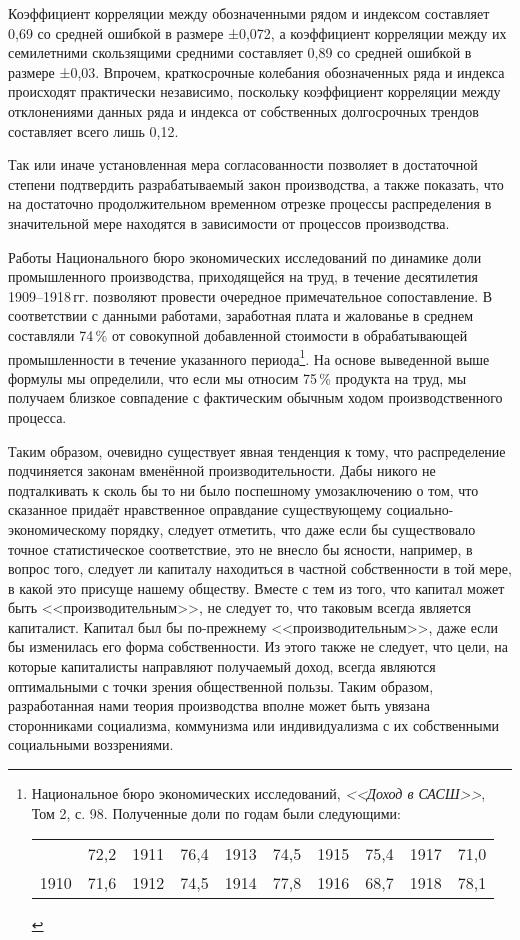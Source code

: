 \documentclass[leqno]{article}  %
\begin{document}
\par
Коэффициент корреляции между обозначенными рядом и индексом составляет 0,69 со средней ошибкой в размере ±0,072, а коэффициент корреляции между их семилетними скользящими средними составляет 0,89 со средней ошибкой в размере ±0,03. Впрочем, краткосрочные колебания обозначенных ряда и индекса происходят практически независимо, поскольку коэффициент корреляции между отклонениями данных ряда и индекса от собственных долгосрочных трендов составляет всего лишь 0,12.
\par
Так или иначе установленная мера согласованности позволяет в достаточной степени подтвердить разрабатываемый закон производства, а также показать, что на достаточно продолжительном временном отрезке процессы распределения в значительной мере находятся в зависимости от процессов производства.
\par
Работы Национального бюро экономических исследований по динамике доли промышленного производства, приходящейся на труд, в течение десятилетия 1909--1918\,гг. позволяют провести очередное примечательное сопоставление. В соответствии с данными работами, заработная плата и жалованье в среднем составляли 74\,\% от совокупной добавленной стоимости в обрабатывающей промышленности в течение указанного периода\footnote{Национальное бюро экономических исследований, \emph{<<Доход в САСШ>>}, Том 2, с. 98. Полученные доли по годам были следующими:
\begin{tabular}{lrlrlrlrlr}
\centering
1909 & 72,2 & 1911 & 76,4 & 1913 & 74,5 & 1915 & 75,4 & 1917 & 71,0\\
1910 & 71,6 & 1912 & 74,5 & 1914 & 77,8 & 1916 & 68,7 & 1918 & 78,1
\end{tabular}}.
На основе выведенной выше формулы мы определили, что если мы относим 75\,\% продукта на труд, мы получаем близкое совпадение с фактическим обычным ходом производственного процесса.
\par
Таким образом, очевидно существует явная тенденция к тому, что распределение подчиняется законам вменённой производительности. Дабы никого не подталкивать к сколь бы то ни было поспешному умозаключению о том, что сказанное придаёт нравственное оправдание существующему социально-экономическому порядку, следует отметить, что
даже если бы существовало точное статистическое соответствие, это не внесло бы ясности, например, в вопрос того, следует ли капиталу находиться в частной собственности в той мере, в какой это присуще нашему обществу. Вместе с тем из того, что капитал может быть <<производительным>>, не следует то, что таковым всегда является капиталист. Капитал был бы по-прежнему <<производительным>>, даже если бы изменилась его форма собственности. Из этого также не следует, что цели, на которые капиталисты направляют получаемый доход, всегда являются оптимальными с точки зрения общественной пользы. Таким образом, разработанная нами теория производства вполне может быть увязана сторонниками социализма, коммунизма или индивидуализма с их собственными социальными воззрениями.
\end{document}
